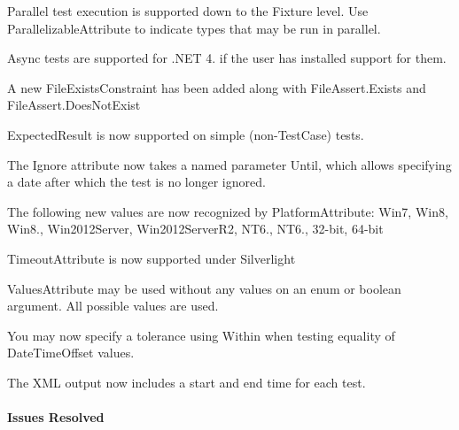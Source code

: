 \begin{DoxyItemize}
\item Parallel test execution is supported down to the Fixture level. Use Parallelizable\+Attribute to indicate types that may be run in parallel.
\item Async tests are supported for .N\+ET 4. if the user has installed support for them.
\item A new File\+Exists\+Constraint has been added along with File\+Assert.\+Exists and File\+Assert.\+Does\+Not\+Exist
\item Expected\+Result is now supported on simple (non-\/\+Test\+Case) tests.
\item The Ignore attribute now takes a named parameter Until, which allows specifying a date after which the test is no longer ignored.
\item The following new values are now recognized by Platform\+Attribute\+: Win7, Win8, Win8., Win2012\+Server, Win2012\+Server\+R2, N\+T6., N\+T6., 32-\/bit, 64-\/bit
\item Timeout\+Attribute is now supported under Silverlight
\item Values\+Attribute may be used without any values on an enum or boolean argument. All possible values are used.
\item You may now specify a tolerance using Within when testing equality of Date\+Time\+Offset values.
\item The X\+ML output now includes a start and end time for each test.
\end{DoxyItemize}

\paragraph*{Issues Resolved}


